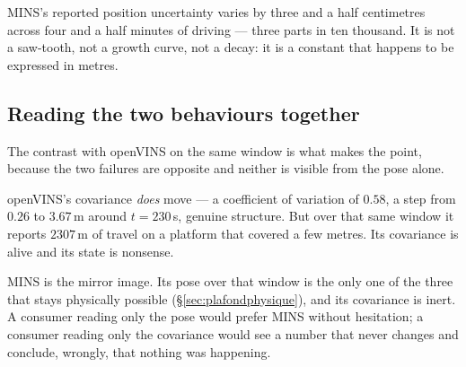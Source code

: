 \noindent MINS's reported position uncertainty varies by three and a half
centimetres across four and a half minutes of driving --- three parts in ten
thousand. It is not a saw-tooth, not a growth curve, not a decay: it is a
constant that happens to be expressed in metres.

\begin{center}
\end{center}

\subsection{Reading the two behaviours together}

The contrast with openVINS on the same window is what makes the point,
because the two failures are opposite and neither is visible from the pose
alone.

openVINS's covariance \emph{does} move --- a coefficient of variation of
$0.58$, a step from $0.26$ to $3.67$\,m around $t=230$\,s, genuine
structure. But over that same window it reports $2307$\,m of travel on a
platform that covered a few metres. Its covariance is alive and its state is
nonsense.

MINS is the mirror image. Its pose over that window is the only one of the
three that stays physically possible (\S\ref{sec:plafondphysique}), and its
covariance is inert. A consumer reading only the pose would prefer MINS
without hesitation; a consumer reading only the covariance would see a
number that never changes and conclude, wrongly, that nothing was happening.


